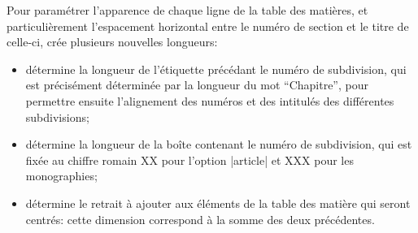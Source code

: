 \begin{noprint}
\renewcommand*{\cftparagraphaftersnum}{.}
\renewcommand*{\cftparagraphaftersnumb}{\upshape\mdseries}
\renewcommand*{\cftparagraphfont}{\footnotesize\if@modern\sffamily\scshape\else\bfseries\fi}
\setlength{\cftbeforeparagraphskip}{\z@}
\end{noprint}

\begin{noprint}
\renewcommand*{\cftsubparagraphaftersnum}{.}
\renewcommand*{\cftsubparagraphaftersnumb}{\upshape\mdseries}
\renewcommand*{\cftsubparagraphfont}{\footnotesize\if@modern\sffamily\scshape\else\bfseries\fi}
\setlength{\cftbeforesubparagraphskip}{\z@}
\end{noprint}




\begin{developer}
Pour paramétrer l'apparence de chaque ligne de la table des matières, et particulièrement l'espacement horizontal entre le numéro de section et le titre de celle-ci, \frenchlaw crée plusieurs nouvelles longueurs:
\begin{itemize}
	\item{} détermine la longueur de l'étiquette précédant le numéro de subdivision, qui est précisément déterminée par la longueur du mot \enquote{Chapitre}, pour permettre ensuite l'alignement des numéros et des intitulés des différentes subdivisions;
	\item{} détermine la longueur de la boîte contenant le numéro de subdivision, qui est fixée au chiffre romain XX pour l'option |article| et XXX pour les monographies;
	\item{} détermine le retrait à ajouter aux éléments de la table des matière qui seront centrés: cette dimension correspond à la somme des deux précédentes.
\end{itemize}
\end{developer}

